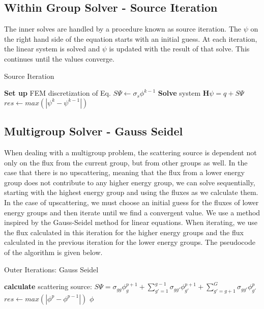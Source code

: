 \subsection{Within Group Solver - Source Iteration}
The inner solves are handled by a procedure known as source iteration. The $\psi$ on the right hand side of the equation starts with an initial guess. At each iteration, the linear system is solved and $\psi$ is updated with the result of that solve. This continues until the values converge. 
\begin{algorithm}
\caption{Source Iteration}
\begin{algorithmic}
 
    \State \textbf{Set up} FEM discretization of Eq.
    \State $S\Psi \gets \sigma_s \phi^{k-1}$ 
    \State \textbf{Solve} system $\textbf{H}\psi=q + S\Psi$
    \State $res \gets max(|\psi^{k} - \psi^{k-1}|)$
\EndWhile
\end{algorithmic}
\end{algorithm}

\subsection{Multigroup Solver - Gauss Seidel}
When dealing with a multigroup problem, the scattering source is dependent not only on the flux from the current group, but from other groups as well. In the case that there is no upscattering, meaning that the flux from a lower energy group does not contribute to any higher energy group, we can solve sequentially, starting with the highest energy group and using the fluxes as we calculate them. In the case of upscattering, we must choose an initial guess for the fluxes of lower energy groups and then iterate until we find a convergent value. We use a method inspired by the Gauss-Seidel method for linear equations. When iterating, we use the flux calculated in this iteration for the higher energy groups and the flux calculated in the previous iteration for the lower energy groups. The pseudocode of the algorithm is given below. 
\begin{algorithm}
\caption{Outer Iterations: Gauss Seidel}
\begin{algorithmic}
     
            \State \textbf{calculate} scattering source: \State $S\Psi = \sigma_{gg}\phi_g^{p+1} + \sum\limits_{g'=1}^{g-1} \sigma_{gg'} \phi_{g'}^{p+1} + \sum\limits_{g'=g+1}^G \sigma_{gg'}\phi_{g'}^p$
        \EndProcedure
        \EndFor
        \State $res \gets max(|\phi^{p} - \phi^{p-1}|)$  
        \EndWhile
    \Return $\phi$
\end{algorithmic}
\end{algorithm}


